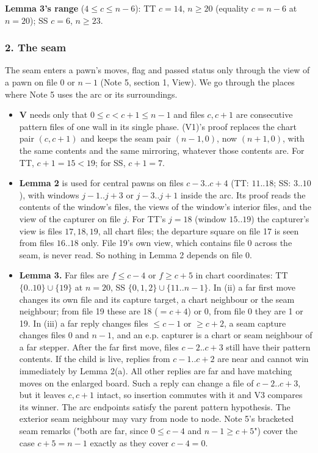 \textbf{Lemma 3's range} ($4\le c\le n-6$): TT $c=14$, $n\ge20$ (equality $c=n-6$ at $n=20$); SS $c=6$, $n\ge23$.

\subsubsection*{2. The seam}
The seam enters a pawn's moves, flag and passed status only through the view of a pawn on file $0$ or $n-1$ (Note 5, section 1, View). We go through the places where Note 5 uses the arc or its surroundings.

\begin{itemize}
\item \textbf{V} needs only that $0\le c<c+1\le n-1$ and files $c,c+1$ are consecutive pattern files of one wall in its single phase. (V1)'s proof replaces the chart pair $(c,c+1)$ and keeps the seam pair $(n-1,0)$, now $(n+1,0)$, with the same contents and the same mirroring, whatever those contents are. For TT, $c+1=15<19$; for SS, $c+1=7$.
\item \textbf{Lemma 2} is used for central pawns on files $c-3..c+4$ (TT: $11..18$; SS: $3..10$), with windows $j-1..j+3$ or $j-3..j+1$ inside the arc. Its proof reads the contents of the window's files, the views of the window's interior files, and the view of the capturer on file $j$. For TT's $j=18$ (window $15..19$) the capturer's view is files $17,18,19$, all chart files; the departure square on file 17 is seen from files $16..18$ only. File 19's own view, which contains file 0 across the seam, is never read. So nothing in Lemma 2 depends on file 0.
\item \textbf{Lemma 3.} Far files are $f\le c-4$ or $f\ge c+5$ in chart coordinates: TT $\{0..10\}\cup\{19\}$ at $n=20$, SS $\{0,1,2\}\cup\{11..n-1\}$. In (ii) a far first move changes its own file and its capture target, a chart neighbour or the seam neighbour; from file 19 these are 18 ($=c+4$) or 0, from file 0 they are 1 or 19. In (iii) a far reply changes files $\le c-1$ or $\ge c+2$, a seam capture changes files 0 and $n-1$, and an e.p. capturer is a chart or seam neighbour of a far stepper. After the far first move, files $c-2..c+3$ still have their pattern contents. If the child is live, replies from $c-1..c+2$ are near and cannot win immediately by Lemma 2(a). All other replies are far and have matching moves on the enlarged board. Such a reply can change a file of $c-2..c+3$, but it leaves $c,c+1$ intact, so insertion commutes with it and V3 compares its winner. The arc endpoints satisfy the parent pattern hypothesis. The exterior seam neighbour may vary from node to node. Note 5's bracketed seam remarks ("both are far, since $0\le c-4$ and $n-1\ge c+5$") cover the case $c+5=n-1$ exactly as they cover $c-4=0$.

\end{itemize}
